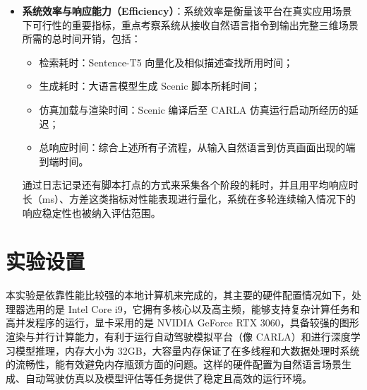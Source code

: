 \begin{itemize}
	\item \textbf{系统效率与响应能力（Efficiency）}：系统效率是衡量该平台在真实应用场景下可行性的重要指标，重点考察系统从接收自然语言指令到输出完整三维场景所需的总时间开销，包括：
	\begin{itemize}
		\item 检索耗时：Sentence-T5 向量化及相似描述查找所用时间；
		\item 生成耗时：大语言模型生成 Scenic 脚本所耗时间；
		\item 仿真加载与渲染时间：Scenic 编译后至 CARLA 仿真运行启动所经历的延迟；
		\item 总响应时间：综合上述所有子流程，从输入自然语言到仿真画面出现的端到端时间。
	\end{itemize}
通过日志记录还有脚本打点的方式来采集各个阶段的耗时，并且用平均响应时长（ms）、方差这类指标对性能表现进行量化，系统在多轮连续输入情况下的响应稳定性也被纳入评估范围。
\end{itemize}




	
\section{实验设置}

本实验是依靠性能比较强的本地计算机来完成的，其主要的硬件配置情况如下，处理器选用的是 Intel Core i9，它拥有多核心以及高主频，能够支持复杂计算任务和高并发程序的运行，显卡采用的是 NVIDIA GeForce RTX 3060，具备较强的图形渲染与并行计算能力，有利于运行自动驾驶模拟平台（像 CARLA）和进行深度学习模型推理，内存大小为 32GB，大容量内存保证了在多线程和大数据处理时系统的流畅性，能有效避免内存瓶颈方面的问题。这样的硬件配置为自然语言场景生成、自动驾驶仿真以及模型评估等任务提供了稳定且高效的运行环境。

\vspace{10pt} %

